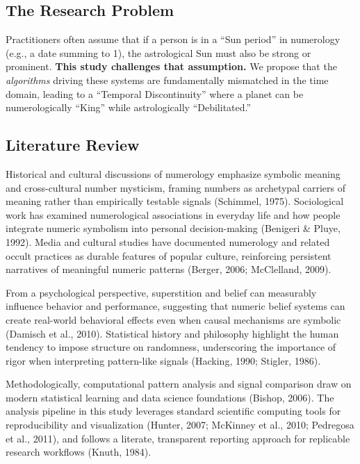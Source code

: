 \documentclass[
  american,
  11pt,
  oneside,
  openany]{article}
\begin{document}
\subsection{The Research Problem}\label{the-research-problem}

Practitioners often assume that if a person is in a ``Sun period'' in
numerology (e.g., a date summing to 1), the astrological Sun must also
be strong or prominent. \textbf{This study challenges that assumption.}
We propose that the \emph{algorithms} driving these systems are
fundamentally mismatched in the time domain, leading to a ``Temporal
Discontinuity'' where a planet can be numerologically ``King'' while
astrologically ``Debilitated.''

\subsection{Literature Review}\label{literature-review}

Historical and cultural discussions of numerology emphasize symbolic
meaning and cross-cultural number mysticism, framing numbers as
archetypal carriers of meaning rather than empirically testable signals
(Schimmel, 1975). Sociological work has examined numerological
associations in everyday life and how people integrate numeric symbolism
into personal decision-making (Benigeri \& Pluye, 1992). Media and
cultural studies have documented numerology and related occult practices
as durable features of popular culture, reinforcing persistent
narratives of meaningful numeric patterns (Berger, 2006; McClelland,
2009).

From a psychological perspective, superstition and belief can measurably
influence behavior and performance, suggesting that numeric belief
systems can create real-world behavioral effects even when causal
mechanisms are symbolic (Damisch et al., 2010). Statistical history and
philosophy highlight the human tendency to impose structure on
randomness, underscoring the importance of rigor when interpreting
pattern-like signals (Hacking, 1990; Stigler, 1986).

Methodologically, computational pattern analysis and signal comparison
draw on modern statistical learning and data science foundations
(Bishop, 2006). The analysis pipeline in this study leverages standard
scientific computing tools for reproducibility and visualization
(Hunter, 2007; McKinney et al., 2010; Pedregosa et al., 2011), and
follows a literate, transparent reporting approach for replicable
research workflows (Knuth, 1984).
\end{document}
